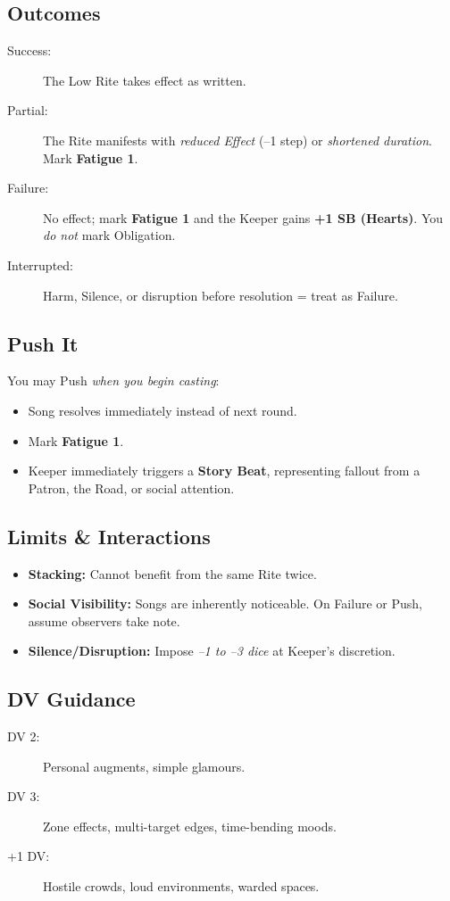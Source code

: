 \subsection*{Outcomes}
\begin{description}
\item[Success:] The Low Rite takes effect as written.
\item[Partial:] The Rite manifests with \emph{reduced Effect} (–1 step) or \emph{shortened duration}. Mark \textbf{Fatigue 1}.
\item[Failure:] No effect; mark \textbf{Fatigue 1} and the Keeper gains \textbf{+1 SB (Hearts)}. You \emph{do not} mark Obligation.
\item[Interrupted:] Harm, Silence, or disruption before resolution = treat as Failure.
\end{description}

\subsection*{Push It}
You may Push \emph{when you begin casting}:
\begin{itemize}
\item Song resolves immediately instead of next round.
\item Mark \textbf{Fatigue 1}.
\item Keeper immediately triggers a \textbf{Story Beat}, representing fallout from a Patron, the Road, or social attention.
\end{itemize}

\subsection*{Limits \& Interactions}
\begin{itemize}
\item \textbf{Stacking:} Cannot benefit from the same Rite twice.
\item \textbf{Social Visibility:} Songs are inherently noticeable. On Failure or Push, assume observers take note.
\item \textbf{Silence/Disruption:} Impose \emph{–1 to –3 dice} at Keeper’s discretion.
\end{itemize}

\subsection*{DV Guidance}
\label{talent:cantors-path-dv}
\begin{description}
\item[DV 2:] Personal augments, simple glamours.
\item[DV 3:] Zone effects, multi-target edges, time-bending moods.
\item[+1 DV:] Hostile crowds, loud environments, warded spaces.
\end{description}

